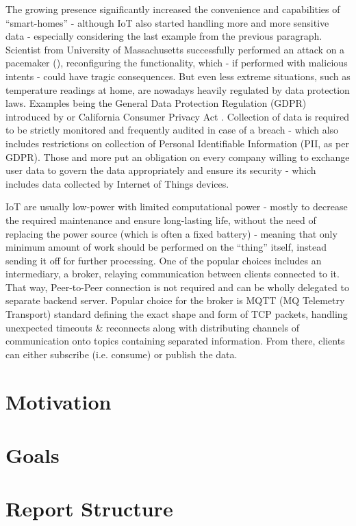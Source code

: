 The growing presence significantly increased the convenience and capabilities of ``smart-homes'' - although IoT also started handling more and more sensitive data - especially considering the last example from the previous paragraph. Scientist from University of Massachusetts successfully performed an attack on a pacemaker (\citeauthor{4531149}), reconfiguring the functionality, which - if performed with malicious intents - could have tragic consequences. But even less extreme situations, such as temperature readings at home, are nowadays heavily regulated by data protection laws. Examples being the General Data Protection Regulation (GDPR) introduced by \citet{EUdataregulations2018} or California Consumer Privacy Act \citep{CCPA}. Collection of data is required to be strictly monitored and frequently audited in case of a breach - which also includes restrictions on collection of Personal Identifiable Information (PII, as per GDPR). Those and more put an obligation on every company willing to exchange user data to govern the data appropriately and ensure its security - which includes data collected by Internet of Things devices.

IoT are usually low-power with limited computational power - mostly to decrease the required maintenance and ensure long-lasting life, without the need of replacing the power source (which is often a fixed battery) - meaning that only minimum amount of work should be performed on the ``thing'' itself, instead sending it off for further processing. One of the popular choices includes an intermediary, a broker, relaying communication between clients connected to it. That way, Peer-to-Peer connection is not required and can be wholly delegated to separate backend server. Popular choice for the broker is MQTT (MQ Telemetry Transport) standard defining the exact shape and form of TCP packets, handling unexpected timeouts \& reconnects along with distributing channels of communication onto topics containing separated information. From there, clients can either subscribe (i.e. consume) or publish the data.

\section{Motivation}

\section{Goals}

\section{Report Structure}


